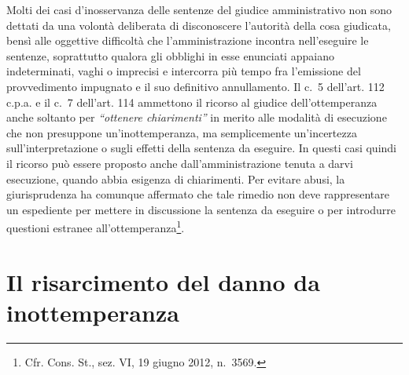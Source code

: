 \documentclass[12pt,it,a4paper,]{report}
\begin{document}
Molti dei casi d'inosservanza delle sentenze del giudice amministrativo
non sono dettati da una volontà deliberata di disconoscere l'autorità
della cosa giudicata, bensì alle oggettive difficoltà che
l'amministrazione incontra nell'eseguire le sentenze, soprattutto
qualora gli obblighi in esse enunciati appaiano indeterminati, vaghi o
imprecisi e intercorra più tempo fra l'emissione del provvedimento
impugnato e il suo definitivo annullamento. Il c.~5 dell'art. 112 c.p.a.
e il c.~7 dell'art. 114 ammettono il ricorso al giudice
dell'ottemperanza anche soltanto per \emph{``ottenere chiarimenti''} in
merito alle modalità di esecuzione che non presuppone un'inottemperanza,
ma semplicemente un'incertezza sull'interpretazione o sugli effetti
della sentenza da eseguire. In questi casi quindi il ricorso può essere
proposto anche dall'amministrazione tenuta a darvi esecuzione, quando
abbia esigenza di chiarimenti. Per evitare abusi, la giurisprudenza ha
comunque affermato che tale rimedio non deve rappresentare un espediente
per mettere in discussione la sentenza da eseguire o per introdurre
questioni estranee all'ottemperanza\footnote{Cfr. Cons. St., sez. VI, 19
  giugno 2012, n.~3569.}.

\hypertarget{il-risarcimento-del-danno-da-inottemperanza}{%
\section{Il risarcimento del danno da
inottemperanza}\label{il-risarcimento-del-danno-da-inottemperanza}}
\end{document}
